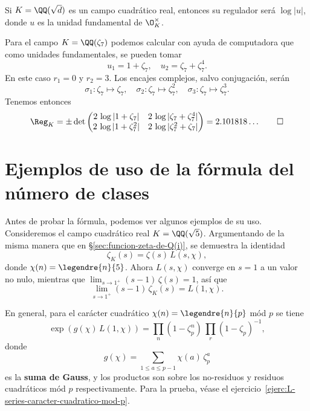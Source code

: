 \begin{ejemplo}
  Si $K = \QQ (\sqrt{d})$ es un campo cuadrático real, entonces su regulador
  será $\log |u|$, donde $u$ es la unidad fundamental de $\O_K^\times$.
\end{ejemplo}

\begin{ejemplo}
  Para el campo $K = \QQ (\zeta_7)$ podemos calcular con ayuda de computadora
  que como unidades fundamentales, se pueden tomar
  $$u_1 = 1 + \zeta_7, \quad u_2 = \zeta_7 + \zeta_7^4.$$
  En este caso $r_1 = 0$ y $r_2 = 3$. Los encajes complejos, salvo conjugación,
  serán
  \[ \sigma_1\colon \zeta_7 \mapsto \zeta_7, \quad
     \sigma_2\colon \zeta_7 \mapsto \zeta_7^2, \quad
     \sigma_3\colon \zeta_7 \mapsto \zeta_7^3. \]
  Tenemos entonces
  \[ \Reg_K = \pm\det\begin{pmatrix}
    2\,\log |1 + \zeta_7| & 2\,\log |\zeta_7 + \zeta_7^4| \\
    2\,\log |1 + \zeta_7^2| & 2\,\log |\zeta_7^2 + \zeta_7| \\
  \end{pmatrix} = 2.101818\ldots \qedhere \]
\end{ejemplo}


\section{Ejemplos de uso de la fórmula del número de clases}

Antes de probar la fórmula, podemos ver algunos ejemplos de su uso. Consideremos
el campo cuadrático real $K = \QQ (\sqrt{5})$. Argumentando de la misma manera
que en \S\ref{sec:funcion-zeta-de-Q(i)}, se demuestra la identidad
$$\zeta_K (s) = \zeta (s) \, L (s,\chi),$$
donde $\chi (n) = \legendre{n}{5}$.
Ahora $L (s,\chi)$ converge en $s = 1$ a un valor no nulo, mientras que
$\lim_{s\to 1^+} (s - 1)\,\zeta (s) = 1$, así que
$$\lim_{s \to 1^+} (s - 1)\,\zeta_K (s) = L (1,\chi).$$

En general, para el carácter cuadrático $\chi (n) = \legendre{n}{p}$ mód $p$
se tiene
$$\exp (g (\chi)\,L (1,\chi)) = \prod_n (1 - \zeta_p^n)\,\prod_r (1 - \zeta_p)^{-1},$$
donde
$$g (\chi) = \sum_{1 \le a \le p-1} \chi (a)\,\zeta_p^a$$
es la \textbf{suma de Gauss}, y los productos son sobre los no-residuos y
residuos cuadráticos mód $p$ respectivamente. Para la prueba, véase
el ejercicio~\ref{ejerc:L-series-caracter-cuadratico-mod-p}.

